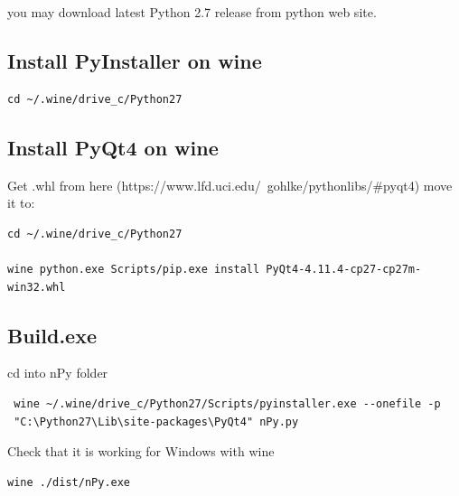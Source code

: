 \documentclass[a4paper,10pt]{article}
\begin{document}
\noindent you may download latest Python 2.7 release from python web site.

\subsection{Install PyInstaller on wine}
\begin{verbatim}
cd ~/.wine/drive_c/Python27 
\end{verbatim}

\subsection{Install PyQt4 on wine}

\noindent Get .whl from here (https://www.lfd.uci.edu/~gohlke/pythonlibs/\#pyqt4) move it to: 
\begin{verbatim}
cd ~/.wine/drive_c/Python27

wine python.exe Scripts/pip.exe install PyQt4-4.11.4-cp27-cp27m-win32.whl
\end{verbatim}

\subsection{Build.exe}
\noindent cd into nPy folder 

\begin{verbatim}
 wine ~/.wine/drive_c/Python27/Scripts/pyinstaller.exe --onefile -p 
 "C:\Python27\Lib\site-packages\PyQt4" nPy.py
\end{verbatim}

\noindent Check that it is working for Windows with wine
\begin{verbatim}
wine ./dist/nPy.exe
\end{verbatim}
\end{document}
